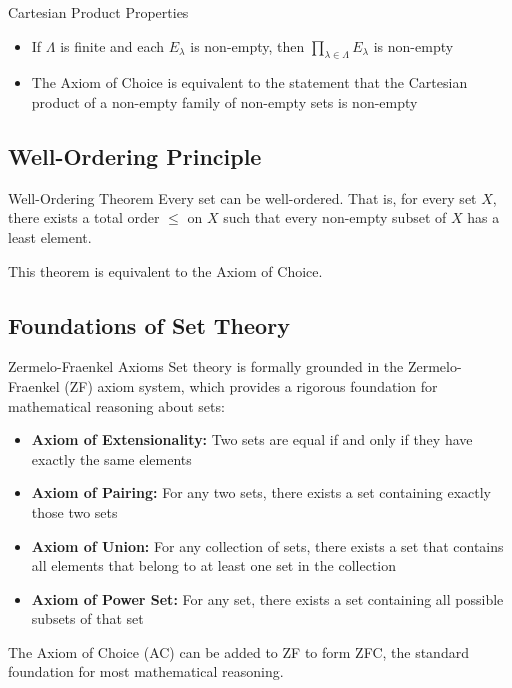 \documentclass[12pt,a4paper]{article}
\begin{document}
\begin{theorembox}{Cartesian Product Properties}
\begin{itemize}
    \item If $\Lambda$ is finite and each $E_{\lambda}$ is non-empty, then $\prod_{\lambda\in\Lambda} E_{\lambda}$ is non-empty
    \item The Axiom of Choice is equivalent to the statement that the Cartesian product of a non-empty family of non-empty sets is non-empty
\end{itemize}
\end{theorembox}

\subsection{Well-Ordering Principle}

\begin{theorembox}{Well-Ordering Theorem}
Every set can be well-ordered. That is, for every set $X$, there exists a total order $\leq$ on $X$ such that every non-empty subset of $X$ has a least element.

This theorem is equivalent to the Axiom of Choice.
\end{theorembox}

\subsection{Foundations of Set Theory}

\begin{definitionbox}{Zermelo-Fraenkel Axioms}
Set theory is formally grounded in the Zermelo-Fraenkel (ZF) axiom system, which provides a rigorous foundation for mathematical reasoning about sets:

\begin{itemize}
    \item \textbf{Axiom of Extensionality:} Two sets are equal if and only if they have exactly the same elements
    \item \textbf{Axiom of Pairing:} For any two sets, there exists a set containing exactly those two sets
    \item \textbf{Axiom of Union:} For any collection of sets, there exists a set that contains all elements that belong to at least one set in the collection
    \item \textbf{Axiom of Power Set:} For any set, there exists a set containing all possible subsets of that set
\end{itemize}

The Axiom of Choice (AC) can be added to ZF to form ZFC, the standard foundation for most mathematical reasoning.
\end{definitionbox}
\end{document}
